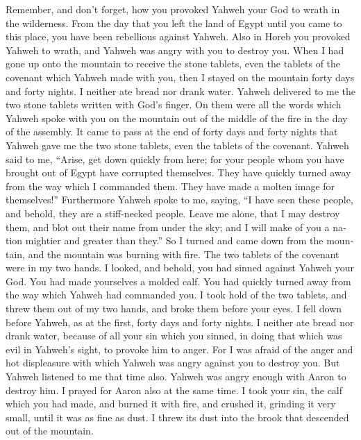 \begin{paracol}{2}
\begin{otherlanguage}{english}
 Remember, and don't forget, how you provoked Yahweh your
God to wrath in the wilderness. From the day that you left the land of
Egypt until you came to this place, you have been rebellious against
Yahweh.  Also in Horeb you provoked Yahweh to wrath, and
Yahweh was angry with you to destroy you.  When I had gone
up onto the mountain to receive the stone tablets, even the tablets of
the covenant which Yahweh made with you, then I stayed on the mountain
forty days and forty nights. I neither ate bread nor drank water.
 Yahweh delivered to me the two stone tablets written
with God's finger. On them were all the words which Yahweh spoke with
you on the mountain out of the middle of the fire in the day of the
assembly.  It came to pass at the end of forty days and
forty nights that Yahweh gave me the two stone tablets, even the tablets
of the covenant.  Yahweh said to me, ``Arise, get down
quickly from here; for your people whom you have brought out of Egypt
have corrupted themselves. They have quickly turned away from the way
which I commanded them. They have made a molten image for themselves!''
 Furthermore Yahweh spoke to me, saying, ``I have seen
these people, and behold, they are a stiff-necked people.
 Leave me alone, that I may destroy them, and blot out
their name from under the sky; and I will make of you a nation mightier
and greater than they.''  So I turned and came down from
the mountain, and the mountain was burning with fire. The two tablets of
the covenant were in my two hands.  I looked, and behold,
you had sinned against Yahweh your God. You had made yourselves a molded
calf. You had quickly turned away from the way which Yahweh had
commanded you.  I took hold of the two tablets, and threw
them out of my two hands, and broke them before your eyes.
 I fell down before Yahweh, as at the first, forty days
and forty nights. I neither ate bread nor drank water, because of all
your sin which you sinned, in doing that which was evil in Yahweh's
sight, to provoke him to anger.  For I was afraid of the
anger and hot displeasure with which Yahweh was angry against you to
destroy you. But Yahweh listened to me that time also. 
Yahweh was angry enough with Aaron to destroy him. I prayed for Aaron
also at the same time.  I took your sin, the calf which
you had made, and burned it with fire, and crushed it, grinding it very
small, until it was as fine as dust. I threw its dust into the brook
that descended out of the mountain.


\end{otherlanguage}
\end{paracol}
